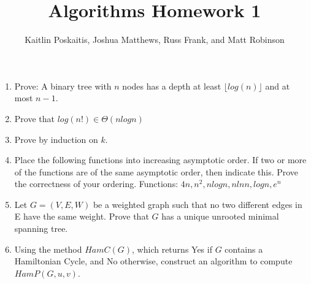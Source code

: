 \documentclass[12pt]{article}
\title{\bf Algorithms Homework 1}
\author{Kaitlin Poskaitis, Joshua Matthews, Russ Frank, and Matt Robinson}
\date{}
\begin{document}
\maketitle

\begin{enumerate}
\item Prove: A binary tree with $n$ nodes has a depth at least $\lfloor
log(n) \rfloor$ and at most $n - 1$.

\item Prove that $log(n!) \in \Theta(nlogn)$


\item Prove by induction on $k$.


\item Place the following functions into increasing asymptotic order. If two
or more of the functions are of the same asymptotic order, then indicate this.
Prove the correctness of your ordering.
Functions: $4n, n^2, nlogn, nlnn, logn, e^n$

\item Let $G = (V,E,W)$ be a weighted graph such that no two different edges
in E have the same weight. Prove that $G$ has a unique unrooted minimal spanning
tree.

\item Using the method $HamC(G)$, which returns Yes if $G$ contains a
Hamiltonian Cycle, and No otherwise, construct an algorithm to compute
$HamP(G,u,v)$.

\end{enumerate}
\end{document}
